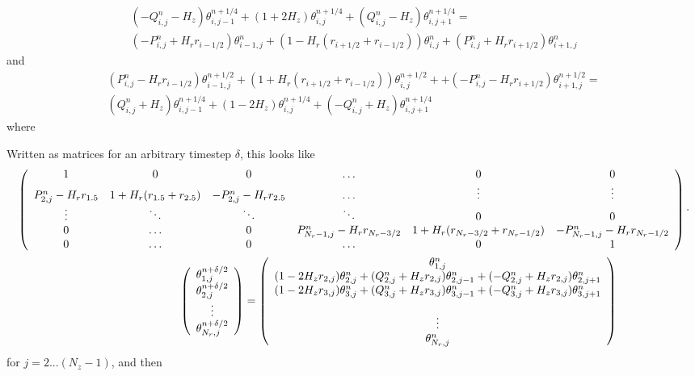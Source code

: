 \documentclass{article}
\begin{document}
\begin{eqnarray}
  ( - Q_{i,j}^n - H_z) \theta_{i,j-1}^{n+1/4}                           +    (1 + 2 H_z) \theta_{i,j}^{n+1/4}                         + ( Q_{i,j}^n - H_z ) \theta_{i, j+1}^{n+1/4}  = \\ 
  (-P_{i,j}^{n} + H_r r_{i-1/2}) \theta_{i-1,j}^{n}                        +       (1 - H_r (r_{i+1/2} + r_{i-1/2}) ) \theta_{i,j}^{n}      +  (P_{i,j}^{n} + H_r r_{i+1/2}) \theta_{i+1,j}^{n}            
\end{eqnarray}
and
\begin{eqnarray}
 (P_{i,j}^{n} - H_r r_{i-1/2}) \theta_{i-1,j}^{n+1/2}  		+		 (1 +  H_r (r_{i+1/2} + r_{i-1/2}) ) \theta_{i,j}^{n+1/2} +                                                           +  ( - P_{i,j}^{n} - H_r r_{i+1/2}) \theta_{i+1,j}^{n+1/2} = \\
(Q_{i,j}^{n} + H_z) \theta_{i,j-1}^{n+1/4} 		+			 (1 - 2 H_z) \theta_{i,j}^{n+1/4} 					+  (- Q_{i,j}^{n} + H_z ) \theta_{i, j+1}^{n+1/4} 
\end{eqnarray}
where

Written as matrices for an arbitrary timestep $\delta$, this looks like
\begin{eqnarray}
\left( \begin{array}{c c c c c c c}
1				&0					&0					&\hdots					&0						&0\\	
P^{n}_{2,j} - H_r r_{1.5}&1+ H_r (r_{1.5} + r_{2.5})	&-P^{n}_{2,j} - H_r r_{2.5} 	& \hdots 					& \vdots					&\vdots\\
\vdots 			& \ddots 				& \ddots 				& \ddots 					& 0						&0\\		
0 				& \hdots 				&0	 				&P^{n}_{N_r-1,j} -  H_r r_{N_r-3/2} 	&1+ H_r (r_{N_r-3/2} + r_{N_r-1/2})	& -P^{n}_{N_r-1,j} - H_r r_{N_r-1/2} \\
0 				& \hdots 				&0	 				& \hdots					&0						& 1  
\end{array} \right) \cdot \\
\left( \begin{array}{c}
\theta^{n+\delta/2}_{1,j}  \\
\theta^{n+\delta/2}_{2,j} \\
\vdots \\
\theta^{n+\delta/2}_{N_r,j} \end{array} \right)
=
\left( \begin{array}{c}
 \theta^n_{1,j} \\
(1-2 H_z r_{2,j}) \theta^n_{2,j} + (Q^n_{2,j} + H_z r_{2,j}  ) \theta^n_{2, j-1} + (-Q^n_{2,j} + H_z r_{2,j}  ) \theta^n_{2, j+1}   \\
(1-2 H_z r_{3,j}) \theta^n_{3,j} + (Q^n_{3,j} + H_z r_{3,j} ) \theta^n_{3, j-1} + (-Q^n_{3,j} + H_z r_{3,j}  ) \theta^n_{3, j+1}   \\\\
\vdots \\
\theta^n_{N_r,j} \end{array} \right) \hspace{15ex}
\end{eqnarray}
for $j = 2...(N_z-1)$, and then
\end{document}

